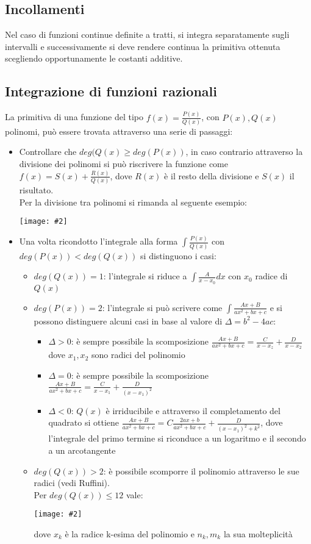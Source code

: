 \documentclass{article}
\newcommand{\im}[2]{
\begin{center}
\texttt{[image: \#2]}
\end{center}
}
\begin{document}
\subsection{Incollamenti}
Nel caso di funzioni continue definite a tratti, si integra separatamente sugli intervalli e successivamente si deve rendere continua la primitiva ottenuta scegliendo opportunamente le costanti additive.

\subsection{Integrazione di funzioni razionali}
La primitiva di una funzione del tipo $f(x)=\frac{P(x)}{Q(x)}$, con $P(x),Q(x)$ polinomi, può essere trovata attraverso una serie di passaggi:
\begin{itemize}
    \item Controllare che $deg(Q(x)\geq deg(P(x))$, in caso contrario attraverso la divisione dei polinomi si può riscrivere la funzione come $f(x)=S(x)+\frac{R(x)}{Q(x)}$, dove $R(x)$ è il resto della divisione e $S(x)$ il risultato.\\
    Per la divisione tra polinomi si rimanda al seguente esempio:
    \im{0.4}{"pol"}
    \item Una volta ricondotto l'integrale alla forma $\int \frac{P(x)}{Q(x)}$ con $deg(P(x))<deg(Q(x))$ si distinguono i casi:
    \begin{itemize}
        \item $deg(Q(x))=1$: l'integrale si riduce a $\int \frac{A}{x-x_0}dx$ con $x_0$ radice di $Q(x)$
        \item $deg(P(x))=2$: l'integrale si può scrivere come $\int \frac{Ax+B}{ax^2+bx+c}$ e si possono distinguere alcuni casi in base al valore di $\Delta=b^2-4ac$:
        \begin{itemize}
            \item $\Delta>0$: è sempre possibile la scomposizione $\frac{Ax+B}{ax^2+bx+c}=\frac{C}{x-x_z}+\frac{D}{x-x_2}$ dove $x_1,x_2$ sono radici del polinomio
            \item $\Delta=0$: è sempre possibile la scomposizione $\frac{Ax+B}{ax^2+bx+c}=\frac{C}{x-x_1}+\frac{D}{(x-x_1)^2}$
            \item $\Delta<0$: $Q(x)$ è irriducibile e attraverso il completamento del quadrato si ottiene $\frac{Ax+B}{ax^2+bx+c}=C\frac{2ax+b}{ax^2+bx+c}+\frac{D}{(x-x_1)^2+k^2}$, dove l'integrale del primo termine si riconduce a un logaritmo e il secondo a un arcotangente
        \end{itemize} 
        \item $deg(Q(x))>2$: è possibile scomporre il polinomio attraverso le sue radici (vedi Ruffini).\\
        Per $deg(Q(x))\leq12$ vale:
        \im{0.6}{"scomp12"}
        dove $x_k$ è la radice k-esima del polinomio e $n_k,m_k$ la sua molteplicità
    \end{itemize}

\end{itemize}
\end{document}
